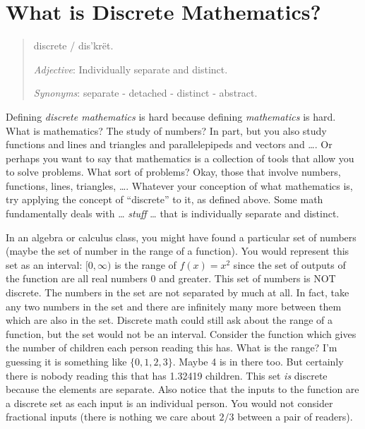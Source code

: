 \documentclass[10pt,]{book}
\theoremstyle{plain}
\theoremstyle{definition}
\theoremstyle{definition}
\theoremstyle{definition}
\begin{document}
\section[What is Discrete Mathematics?]{What is Discrete Mathematics?}\label{sec_intro-intro}
\begin{quote}dis\textperiodcentered{}crete / dis'krët.%
\par
 \emph{Adjective}: Individually separate and distinct.%
\par
\emph{Synonyms}: separate - detached - distinct - abstract.%
\end{quote}

    Defining \emph{discrete mathematics} is hard because defining \emph{mathematics} is hard. What is mathematics? The study of numbers? In part, but you also study functions and lines and triangles and parallelepipeds and vectors and
    \dots{}. Or perhaps you want to say that mathematics is a collection of tools that allow you to solve problems. What sort of problems? Okay, those that involve numbers, functions, lines, triangles,
    \dots{}. Whatever your conception of what mathematics is, try applying the concept of ``discrete'' to it, as defined above. Some math fundamentally deals with
    \dots{} \emph{stuff}
    \dots{} that is individually separate and distinct.
\par

    In an algebra or calculus class, you might have found a particular set of numbers (maybe the set of number in the range of a function). You would represent this set as an interval: \([0,\infty)\) is the range of \(f(x) = x^2\) since the set
    of outputs of the function are all real numbers 0 and greater. This set of numbers is NOT discrete. The numbers in the set are not separated by much at all. In fact, take any two numbers in the set and there are infinitely many more between
    them which are also in the set. Discrete math could still ask about the range of a function, but the set would not be an interval. Consider the function which gives the number of children each person reading this has. What is the range? I'm guessing
    it is something like \(\{0, 1, 2, 3\}\). Maybe 4 is in there too. But certainly there is nobody reading this that has 1.32419 children. This set \emph{is} discrete because the elements are separate. Also notice that the inputs to the function
    are a discrete set as each input is an individual person. You would not consider fractional inputs (there is nothing we care about \(2/3\) between a pair of readers).
\par
\end{document}
